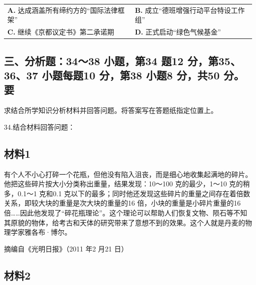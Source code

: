 \documentclass[UTF8,11pt]{ctexart}
\begin{document}
\begin{center}\begin{tabular}{>{\raggedright\arraybackslash}p{\dimexpr(\linewidth-4\tabcolsep)/2\relax}>{\raggedright\arraybackslash}p{\dimexpr(\linewidth-4\tabcolsep)/2\relax}}
\textbf{A.} 达成涵盖所有缔约方的“国际法律框架” & \textbf{B.} 成立“德班增强行动平台特设工作组”\\[.35em]
\textbf{C.} 继续《京都议定书》第二承诺期 & \textbf{D.} 正式启动“绿色气候基金”\\[.35em]\end{tabular}\end{center}

\subsection*{三、分析题：34～38 小题，第34 题12 分，第35、36、37 小题每题10 分，第38 小题8 分，共50 分。要}

求结合所学知识分析材料并回答问题。将答案写在答题纸指定位置上。


34.结合材料回答问题：


\subsection*{材料1}

有个人不小心打碎一个花瓶，但他没有陷入沮丧，而是细心地收集起满地的碎片。他把这些碎片按大小分类称出重量，结果发现：10～100 克的最少，1～10 克的稍多，0.1～1 克和0.1 克以下的最多；同时他还发现这些碎片的重量之间存在着倍数关系，即较大块的重量是次大块的重量的16 倍，小块的重量是小碎片重量的16 倍……因此他发现了“碎花瓶理论”。这个理论可以帮助人们恢复文物、陨石等不知其原貌的物体，给考古和天体的研究带来了意想不到的效果。这个人就是丹麦的物理学家雅各布·博尔。

摘编自《光明日报》（2011 年2 月21 日）

\subsection*{材料2}
\end{document}
